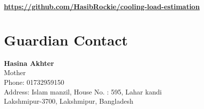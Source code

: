 \documentclass{article}
\begin{document}
      \textbf{\href{https://github.com/HasibRockie/cooling-load-estimation}{https://github.com/HasibRockie/cooling-load-estimation}}

      \vspace*{2cm}
      \section{Guardian Contact}
      \textbf{Hasina Akhter}\\
      Mother\\
      Phone: 01732959150 \\
      Address: Islam manzil, House No. : 595, Lahar kandi\\ Lakshmipur-3700, Lakshmipur, Bangladesh 
 
\end{document}
